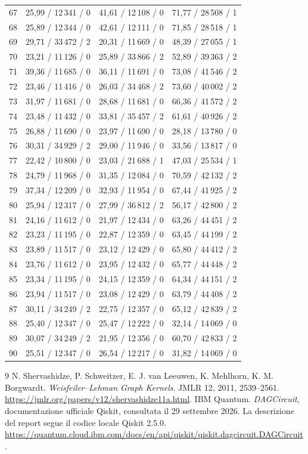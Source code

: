 \documentclass[a4paper,10pt]{article}
\begin{document}
\begin{longtable}{r r r r}
67 & 25,99 / 12\,341 / 0 & 41,61 / 12\,108 / 0 & 71,77 / 28\,508 / 1\\ 
68 & 25,89 / 12\,344 / 0 & 42,61 / 12\,111 / 0 & 71,85 / 28\,518 / 1\\ 
69 & 29,71 / 33\,472 / 2 & 20,31 / 11\,669 / 0 & 48,39 / 27\,055 / 1\\ 
70 & 23,21 / 11\,126 / 0 & 25,89 / 33\,866 / 2 & 52,89 / 39\,363 / 2\\ 
71 & 39,36 / 11\,685 / 0 & 36,11 / 11\,691 / 0 & 73,08 / 41\,546 / 2\\ 
72 & 23,46 / 11\,416 / 0 & 26,03 / 34\,468 / 2 & 73,60 / 40\,002 / 2\\ 
73 & 31,97 / 11\,681 / 0 & 28,68 / 11\,681 / 0 & 66,36 / 41\,572 / 2\\ 
74 & 23,48 / 11\,432 / 0 & 33,81 / 35\,457 / 2 & 61,61 / 40\,926 / 2\\ 
75 & 26,88 / 11\,690 / 0 & 23,97 / 11\,690 / 0 & 28,18 / 13\,780 / 0\\ 
76 & 30,31 / 34\,929 / 2 & 29,00 / 11\,946 / 0 & 33,56 / 13\,817 / 0\\ 
77 & 22,42 / 10\,800 / 0 & 23,03 / 21\,688 / 1 & 47,03 / 25\,534 / 1\\ 
78 & 24,79 / 11\,968 / 0 & 31,35 / 12\,084 / 0 & 70,59 / 42\,132 / 2\\ 
79 & 37,34 / 12\,209 / 0 & 32,93 / 11\,954 / 0 & 67,44 / 41\,925 / 2\\ 
80 & 25,94 / 12\,317 / 0 & 27,99 / 36\,812 / 2 & 56,17 / 42\,800 / 2\\ 
81 & 24,16 / 11\,612 / 0 & 21,97 / 12\,434 / 0 & 63,26 / 44\,451 / 2\\ 
82 & 23,23 / 11\,195 / 0 & 22,87 / 12\,359 / 0 & 63,45 / 44\,199 / 2\\ 
83 & 23,89 / 11\,517 / 0 & 23,12 / 12\,429 / 0 & 65,80 / 44\,412 / 2\\ 
84 & 23,76 / 11\,612 / 0 & 23,95 / 12\,432 / 0 & 65,77 / 44\,448 / 2\\ 
85 & 23,34 / 11\,195 / 0 & 24,15 / 12\,359 / 0 & 64,34 / 44\,151 / 2\\ 
86 & 23,94 / 11\,517 / 0 & 23,08 / 12\,429 / 0 & 63,79 / 44\,408 / 2\\ 
87 & 30,11 / 34\,249 / 2 & 22,75 / 12\,357 / 0 & 65,12 / 42\,839 / 2\\ 
88 & 25,40 / 12\,347 / 0 & 25,47 / 12\,222 / 0 & 32,14 / 14\,069 / 0\\ 
89 & 30,07 / 34\,249 / 2 & 21,95 / 12\,356 / 0 & 60,70 / 42\,833 / 2\\ 
90 & 25,51 / 12\,347 / 0 & 26,54 / 12\,217 / 0 & 31,82 / 14\,069 / 0\\ 
\bottomrule\end{longtable}\endgroup
\begin{thebibliography}{9}
 N. Shervashidze, P. Schweitzer, E. J. van Leeuwen, K. Mehlhorn,
K. M. Borgwardt. \emph{Weisfeiler--Lehman Graph Kernels}. JMLR 12, 2011, 2539--2561.
\url{https://jmlr.org/papers/v12/shervashidze11a.html}.
 IBM Quantum. \emph{DAGCircuit}, documentazione ufficiale Qiskit,
consultata il 29 settembre 2026. La descrizione del report segue il codice
locale Qiskit 2.5.0.
\url{https://quantum.cloud.ibm.com/docs/en/api/qiskit/qiskit.dagcircuit.DAGCircuit}.
\end{thebibliography}
\end{document}

